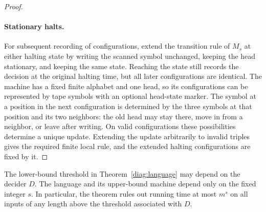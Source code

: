 \begin{proof}
\paragraph{Stationary halts.}
For subsequent recording of configurations, extend the transition rule of
$M_s$ at either halting state by writing the scanned symbol unchanged,
keeping the head stationary, and keeping the same state.  Reaching the
state still records the decision at the original halting time, but all
later configurations are identical.  The machine has a fixed finite
alphabet and one head, so its configurations can be represented by tape
symbols with an optional head-state marker.  The symbol at a position in
the next configuration is determined by the three symbols at that
position and its two neighbors: the old head may stay there, move in from
a neighbor, or leave after writing.  On valid configurations these
possibilities determine a unique update.  Extending the update arbitrarily
to invalid triples gives the required finite local rule, and the extended
halting configurations are fixed by it.
\end{proof}

\begin{remark}
\label{diag:quantifiers}
The lower-bound threshold in Theorem~\ref{diag:language} may depend on the
decider $D$.  The language and its upper-bound machine depend only on the
fixed integer $s$.  In particular, the theorem rules out running time at
most $m^s$ on all inputs of any length above the threshold associated
with $D$.
\end{remark}
